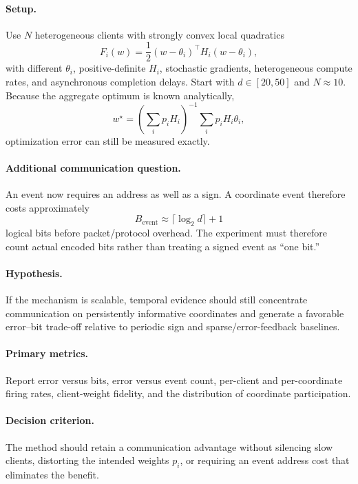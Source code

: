 \paragraph{Setup.}
Use $N$ heterogeneous clients with strongly convex local quadratics
\begin{equation}
  F_i(w)=\frac{1}{2}(w-\theta_i)^\top H_i(w-\theta_i),
\end{equation}
with different $\theta_i$, positive-definite $H_i$, stochastic gradients, heterogeneous compute rates, and asynchronous completion delays. Start with $d\in[20,50]$ and $N\approx10$. Because the aggregate optimum is known analytically,
\begin{equation}
  w^\star=\left(\sum_i p_iH_i\right)^{-1}\sum_i p_iH_i\theta_i,
\end{equation}
optimization error can still be measured exactly.

\paragraph{Additional communication question.}
An event now requires an address as well as a sign. A coordinate event therefore costs approximately
\begin{equation}
  B_{\mathrm{event}}\approx\lceil\log_2 d\rceil+1
\end{equation}
logical bits before packet/protocol overhead. The experiment must therefore count actual encoded bits rather than treating a signed event as ``one bit.''

\paragraph{Hypothesis.}
If the mechanism is scalable, temporal evidence should still concentrate communication on persistently informative coordinates and generate a favorable error--bit trade-off relative to periodic sign and sparse/error-feedback baselines.

\paragraph{Primary metrics.}
Report error versus bits, error versus event count, per-client and per-coordinate firing rates, client-weight fidelity, and the distribution of coordinate participation.

\paragraph{Decision criterion.}
The method should retain a communication advantage without silencing slow clients, distorting the intended weights $p_i$, or requiring an event address cost that eliminates the benefit.

